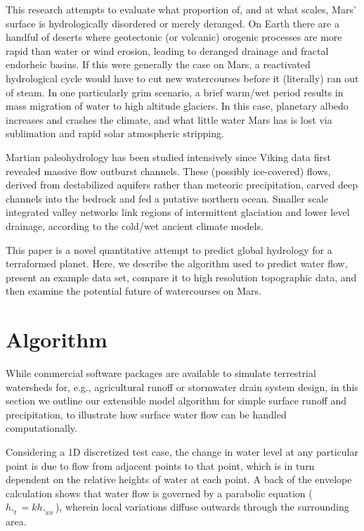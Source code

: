 \documentclass[12pt]{iopart}
\numberwithin{equation}{section}
\begin{document}
This research attempts to evaluate what proportion of, and at what scales, Mars' surface is hydrologically disordered or merely deranged\cite{deranged}. On Earth there are a handful of deserts where geotectonic (or volcanic) orogenic processes are more rapid than water or wind erosion, leading to deranged drainage and fractal endorheic basins. If this were generally the case on Mars, a reactivated hydrological cycle would have to cut new watercourses before it (literally) ran out of steam. In one particularly grim scenario, a brief warm/wet period results in mass migration of water to high altitude glaciers. In this case, planetary albedo increases and crashes the climate, and what little water Mars has is lost via sublimation and rapid solar atmospheric stripping. 

Martian paleohydrology has been studied intensively since Viking data first revealed massive flow outburst channels\cite{Baker,Komatsu,Irwin}. These (possibly ice-covered) flows, derived from destabilized aquifers rather than meteoric precipitation, carved deep channels into the bedrock and fed a putative northern ocean\cite{Parker,Clifford}. Smaller scale integrated valley networks link regions of intermittent glaciation and lower level drainage\cite{Hynek2003}, according to the cold/wet ancient climate models\cite{Scanlon2013,climatemodels}. 

This paper is a novel quantitative attempt to predict global hydrology for a terraformed planet. Here, we describe the algorithm used to predict water flow, present an example data set, compare it to high resolution topographic data, and then examine the potential future of watercourses on Mars.

\section{Algorithm}

While commercial software packages are available to simulate terrestrial watersheds for, e.g., agricultural runoff or stormwater drain system design\cite{commercial}, in this section we outline our extensible model algorithm for simple surface runoff and precipitation, to illustrate how surface water flow can be handled computationally.

Considering a 1D discretized test case, the change in water level at any particular point is due to flow from adjacent points to that point, which is in turn dependent on the relative heights of water at each point. A back of the envelope calculation shows that water flow is governed by a parabolic equation ($h,_t = k h,_{xx}$), wherein local variations diffuse outwards through the surrounding area. 
\end{document}
